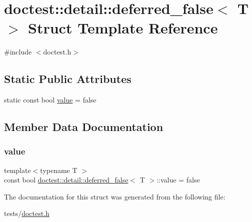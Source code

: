 \hypertarget{structdoctest_1_1detail_1_1deferred__false}{}\section{doctest\+:\+:detail\+:\+:deferred\+\_\+false$<$ T $>$ Struct Template Reference}
\label{structdoctest_1_1detail_1_1deferred__false}


{\ttfamily \#include $<$doctest.\+h$>$}

\subsection*{Static Public Attributes}
\begin{DoxyCompactItemize}
\item 
static const bool \hyperlink{structdoctest_1_1detail_1_1deferred__false_abc8eec7a8439ab592f76068cb408d106}{value} = false
\end{DoxyCompactItemize}


\subsection{Member Data Documentation}
\mbox{\label{structdoctest_1_1detail_1_1deferred__false_abc8eec7a8439ab592f76068cb408d106}} 
\subsubsection{\texorpdfstring{value}{value}}
{\footnotesize\ttfamily template$<$typename T $>$ \\
const bool \hyperlink{structdoctest_1_1detail_1_1deferred__false}{doctest\+::detail\+::deferred\+\_\+false}$<$ T $>$\+::value = false\hspace{0.3cm}{\ttfamily [static]}}



The documentation for this struct was generated from the following file\+:\begin{DoxyCompactItemize}
\item 
tests/\hyperlink{doctest_8h}{doctest.\+h}\end{DoxyCompactItemize}
